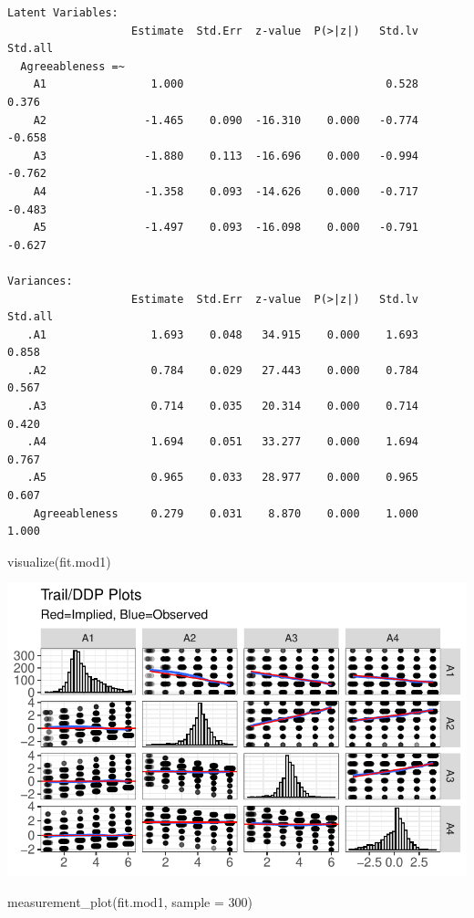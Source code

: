 \documentclass[
  letterpaper,
  DIV=11,
  numbers=noendperiod]{scrreprt}
\newenvironment{Shaded}{\begin{snugshade}}{\end{snugshade}}
\newcommand{\AttributeTok}[1]{\textcolor[rgb]{0.40,0.45,0.13}{#1}}
\newcommand{\DecValTok}[1]{\textcolor[rgb]{0.68,0.00,0.00}{#1}}
\newcommand{\FunctionTok}[1]{\textcolor[rgb]{0.28,0.35,0.67}{#1}}
\newcommand{\NormalTok}[1]{\textcolor[rgb]{0.00,0.23,0.31}{#1}}
\begin{document}
\begin{verbatim}
Latent Variables:
                   Estimate  Std.Err  z-value  P(>|z|)   Std.lv  Std.all
  Agreeableness =~                                                      
    A1                1.000                               0.528    0.376
    A2               -1.465    0.090  -16.310    0.000   -0.774   -0.658
    A3               -1.880    0.113  -16.696    0.000   -0.994   -0.762
    A4               -1.358    0.093  -14.626    0.000   -0.717   -0.483
    A5               -1.497    0.093  -16.098    0.000   -0.791   -0.627

Variances:
                   Estimate  Std.Err  z-value  P(>|z|)   Std.lv  Std.all
   .A1                1.693    0.048   34.915    0.000    1.693    0.858
   .A2                0.784    0.029   27.443    0.000    0.784    0.567
   .A3                0.714    0.035   20.314    0.000    0.714    0.420
   .A4                1.694    0.051   33.277    0.000    1.694    0.767
   .A5                0.965    0.033   28.977    0.000    0.965    0.607
    Agreeableness     0.279    0.031    8.870    0.000    1.000    1.000
\end{verbatim}

\begin{Shaded}
\begin{Highlighting}[]
\FunctionTok{visualize}\NormalTok{(fit.mod1)}
\end{Highlighting}
\end{Shaded}

\includegraphics{Spearman_files/figure-pdf/unnamed-chunk-1-1.pdf}

\begin{Shaded}
\begin{Highlighting}[]
\FunctionTok{measurement\_plot}\NormalTok{(fit.mod1, }\AttributeTok{sample =} \DecValTok{300}\NormalTok{)}
\end{Highlighting}
\end{Shaded}
\end{document}
